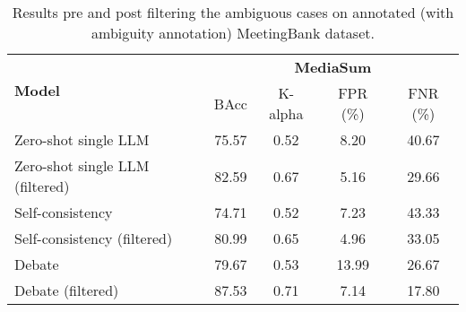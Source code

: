 \begin{table*}
\centering
\begin{tabular}{@{}lcccc@{}}
\toprule
\multirow{2}{*}{\textbf{Model}} & \multicolumn{4}{c}{\textbf{MediaSum}} \\ \cmidrule(l){2-5} 
                                & BAcc  & K-alpha & FPR (\%) & FNR (\%)      

\\ \cmidrule(r){1-5}
Zero-shot single LLM& 75.57	&0.52	&8.20	&40.67
\\
Zero-shot single LLM (filtered) & 82.59	& 0.67	&5.16	&29.66
 \\
\midrule
Self-consistency & 74.71	&0.52&	7.23&	43.33
\\
Self-consistency (filtered) & 80.99	& 0.65 &	4.96	&33.05
 \\
\midrule
Debate & 79.67	&0.53&	13.99	&26.67
\\
Debate (filtered) & 87.53&	0.71	&7.14	&17.80
\\
\bottomrule
\end{tabular}
\caption{Results pre and post filtering the ambiguous cases on annotated (with ambiguity annotation) MeetingBank dataset.}
\label{tab:filtered-main-meetingbank}
\end{table*}